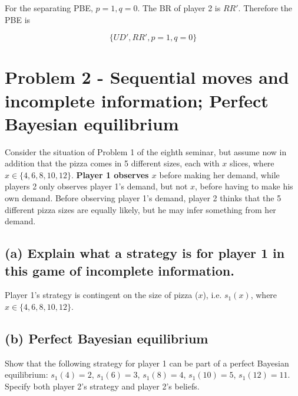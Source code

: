 \documentclass{article}
\begin{document}
For the separating PBE, $p=1,q=0$. The BR of player 2 is
$RR'$. Therefore the PBE is

$$\{UD',RR',p=1,q=0\}$$


\section{Problem 2 - Sequential moves and incomplete information; Perfect
Bayesian equilibrium}

Consider the situation of Problem 1 of the eighth seminar, but assume now in addition that the pizza comes in 5
different sizes, each with $x$ slices, where $x \in \{4, 6, 8, 10, 12\}$. \textbf{Player 1 observes $x$}
before making her demand, while players 2 only observes player 1's demand, but not $x$, before
having to make his own demand. Before observing player 1's demand, player 2 thinks that the 5
different pizza sizes are equally likely, but he may infer something from her demand.
%

%
\subsection*{(a) Explain what a strategy is for player 1 in this game of incomplete information.} 
%
Player 1's strategy is contingent on the size of pizza ($x$), i.e. $s_1(x)$, 
where $x \in \{4, 6, 8, 10, 12\}$.


\subsection*{(b) Perfect Bayesian
equilibrium} Show that the following strategy for player 1 can be part of a perfect Bayesian
equilibrium: $s_1(4) = 2$, $s_1(6) = 3$, $s_1(8) = 4$, $s_1(10) = 5$, $s_1(12) = 11$. Specify
both player 2's strategy and player 2's beliefs. 
%
\bigskip
\end{document}
